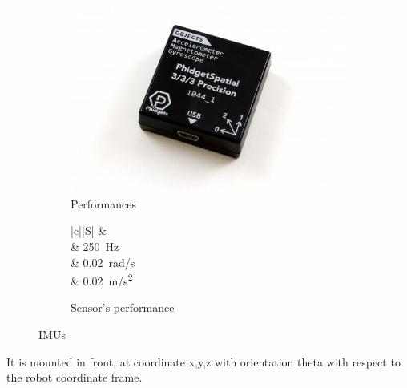 \begin{figure}[!ht]
	\begin{center}
		\begin{subfigure}[b]{.5\textwidth}
			\begin{center}
				\includegraphics[width=1\textwidth]{Images/4-Methods/1044_1B.jpg}
			\end{center}
			\caption{Performances}
			\label{fig:spatial}
		\end{subfigure}
		\begin{subfigure}[b]{.45\textwidth}
			\begin{center}
				\label{tab:evalPhiIMU}
				\begin{tabular}{|c||S|}
					\hline
					 &   \\
					\hline
					\hline
					 &  \SI{250}{Hz} \\
					\hline
					\centering{$\boldsymbol \eta_{\omega}$} & \SI{0.02}{\radian/\second} \\
					\hline
					 & \SI{0.02}{\meter/\second \squared} \\
					\hline
				\end{tabular}
				\caption{Sensor's performance}
			\end{center}
		\end{subfigure}%
		\caption{\glspl{IMU}}
		\label{fig:imusensorphi}
	\end{center}
\end{figure}

It is mounted in front, at coordinate x,y,z with orientation theta with respect to the robot coordinate frame.

